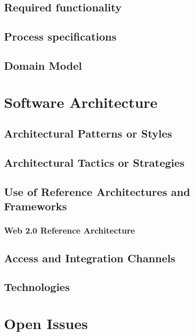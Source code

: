 \documentclass[a4paper,12pt]{article}
\begin{document}
\newpage
\subsection{Required functionality}

\newpage
\subsection{Process specifications}

\newpage
\subsection{Domain Model}

\newpage
\section{Software Architecture}

\subsection{Architectural Patterns or Styles}
	
\subsection{Architectural Tactics or Strategies}

\subsection{Use of Reference Architectures and Frameworks}

\subsubsection{Web 2.0 Reference Architecture}

\subsection{Access and Integration Channels}

\subsection{Technologies}

\newpage
\section{Open Issues}
\end{document}
